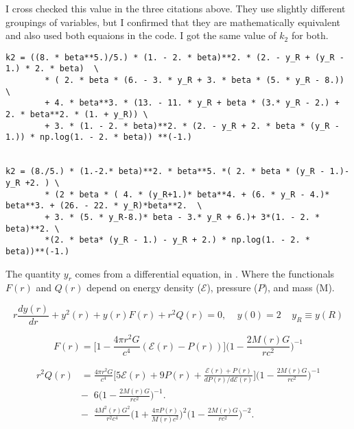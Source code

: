 \documentclass[11pt]{article}
\numberwithin{equation}{section}
\begin{document}
I cross checked this value in the three citations above.  They use slightly different groupings of variables, but I confirmed that they are mathematically equivalent and also used both equaions in the code.  I got the same value of $k_2$ for both.  

\begin{lstlisting}
k2 = ((8. * beta**5.)/5.) * (1. - 2. * beta)**2. * (2. - y_R + (y_R - 1.) * 2. * beta)  \
        * ( 2. * beta * (6. - 3. * y_R + 3. * beta * (5. * y_R - 8.)) \
        + 4. * beta**3. * (13. - 11. * y_R + beta * (3.* y_R - 2.) + 2. * beta**2. * (1. + y_R)) \
        + 3. * (1. - 2. * beta)**2. * (2. - y_R + 2. * beta * (y_R - 1.)) * np.log(1. - 2. * beta)) **(-1.)


k2 = (8./5.) * (1.-2.* beta)**2. * beta**5. *( 2. * beta * (y_R - 1.)- y_R +2. ) \
        * (2 * beta * ( 4. * (y_R+1.)* beta**4. + (6. * y_R - 4.)* beta**3. + (26. - 22. * y_R)*beta**2.  \
        + 3. * (5. * y_R-8.)* beta - 3.* y_R + 6.)+ 3*(1. - 2. * beta)**2. \
        *(2. * beta* (y_R - 1.) - y_R + 2.) * np.log(1. - 2. * beta))**(-1.) 
\end{lstlisting}

The quantity $y_r$ comes from a differential equation, in \cite{Moustakidis_2017}  .  Where the functionals $F(r)$ and $Q(r)$ depend on energy density ($\mathcal{E}$), pressure ($P$), and mass (M).

\begin{equation} \label{diffeq}
r \frac{dy(r)}{dr} + y^{2}(r) + y(r)F(r) + r^{2} Q(r) = 0, \;\;\;\; y(0)=2 \;\;\;\; y_{R} \equiv y(R)
\end{equation}

\begin{equation} \label{F}
F(r) = \bigg[ 1-\frac{4 \pi r^{2} G }{c^{4}} (\mathcal{E}(r)-P(r))  \bigg] \bigg( 1-\frac{2 M(r) G}{r c^{2}}  \bigg)^{-1}
\end{equation}

\begin{align} \label{eq:r2Q}
r^{2} Q(r) &= \frac{4 \pi r^{2} G}{c^{4}} \bigg[ 5 \mathcal{E}(r) + 9 P(r) + \frac{\mathcal{E}(r) + P(r)}{dP(r)/d\mathcal{E}(r)}   \bigg] \bigg(  1 - \frac{2 M(r) G}{r c^{2}} \bigg) ^{-1}  \\
& - \;\; 6 \bigg( 1- \frac{2 M(r) G}{r c^{2}}  \bigg)^{-1}. \nonumber  \\
& - \;\; \frac{4 M^{2}(r) G^{2}}{r^{2}c^{4}} \bigg( 1 + \frac{4 \pi P(r)}{M(r) c^{2}}  \bigg)^{2} \bigg( 1 - \frac{2 M(r) G}{r c^{2}} \bigg)^{-2}. \nonumber
\end{align}
\end{document}
